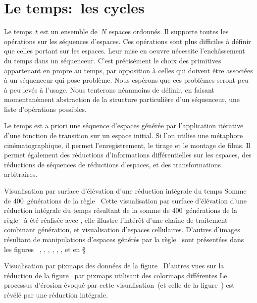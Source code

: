\section{Le temps:~les cycles}

Le temps~$t$ est un ensemble de~$N$ espaces ordonn\'es. %
Il supporte toutes les op\'erations sur les s\'equences d'espaces. %
Ces op\'erations sont plus difficiles \`a d\'efinir que celles portant sur
les espaces. %
Leur mise en oeuvre n\'ecessite l'ench\^assement du temps dans un
s\'equenceur. %
C'est pr\'ecis\'ement le choix des primitives appartenant en propre au
temps, par opposition \`a celles qui doivent \^etre associ\'ees \`a un
s\'equenceur qui pose probl\`eme. %
Nous esp\'erons que ces probl\`emes seront peu \`a peu lev\'es \`a l'usage. %
Nous tenterons n\'eanmoins de d\'efinir, en faisant momentan\'ement
abstraction de la structure particuli\`ere d'un s\'equenceur, une liste
d'op\'erations possibles. %

Le temps est a priori une s\'equence d'espaces g\'en\'er\'ee par l'application
it\'erative d'une fonction de transition sur un espace initial. %
Si l'on utilise une m\'etaphore cin\'ematographique, il permet
l'enregistrement, le tirage et le montage de films. %
Il permet \'egalement des r\'eductions d'informations diff\'erentielles sur
les espaces, des r\'eductions de s\'equences de r\'eductions d'espaces, et
des transformations arbitraires. %

%
{Visualisation par surface d'\'el\'evation d'une r\'eduction int\'egrale du temps}%
{Somme de 400~g\'en\'erations de la r\`egle~}%
{Cette visualisation par surface d'\'el\'evation d'une r\'eduction int\'egrale
  du temps r\'esultant de la somme de 400~g\'en\'erations de la
  r\`egle~ \`a \'et\'e r\'ealis\'ee avec , elle
  illustre l'int\'er\^et d'une cha\^ine de traitement combinant g\'en\'eration,
   et visualisation d'espaces cellulaires. %
  D'autres d'images r\'esultant de manipulations d'espaces g\'en\'er\'es par la
  r\`egle~ sont pr\'esent\'ees dans les figures~%
  , %
  , %
  , %
  , %
  , %
  , %
   et en \S{}~}

%
{Visualisation par pixmaps des donn\'ees de la figure~\protect{}}%
{D'autres  vues sur la r\'eduction de la
  figure~ par pixmaps utilisant des colormaps
  diff\'erentes}%
{Le processus d'\'erosion \'evoqu\'e par cette visualisation~(et celle de la
  figure~) est r\'ev\'el\'e par une r\'eduction int\'egrale.}

